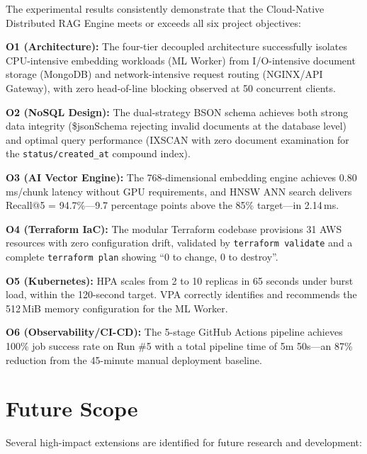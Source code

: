\documentclass[12pt,a4paper]{report}
\begin{document}
The experimental results consistently demonstrate that the Cloud-Native
Distributed RAG Engine meets or exceeds all six project objectives:

\textbf{O1 (Architecture):} The four-tier decoupled architecture successfully
isolates CPU-intensive embedding workloads (ML Worker) from I/O-intensive
document storage (MongoDB) and network-intensive request routing (NGINX/API
Gateway), with zero head-of-line blocking observed at 50 concurrent clients.

\textbf{O2 (NoSQL Design):} The dual-strategy BSON schema achieves both strong
data integrity (\$jsonSchema rejecting invalid documents at the database level)
and optimal query performance (IXSCAN with zero document examination for the
\texttt{status/created\_at} compound index).

\textbf{O3 (AI Vector Engine):} The 768-dimensional embedding engine achieves
0.80\,ms/chunk latency without GPU requirements, and HNSW ANN search delivers
Recall@5 = 94.7\%---9.7 percentage points above the 85\% target---in 2.14\,ms.

\textbf{O4 (Terraform IaC):} The modular Terraform codebase provisions 31 AWS
resources with zero configuration drift, validated by \texttt{terraform validate}
and a complete \texttt{terraform plan} showing ``0 to change, 0 to destroy''.

\textbf{O5 (Kubernetes):} HPA scales from 2 to 10 replicas in 65 seconds under
burst load, within the 120-second target. VPA correctly identifies and recommends
the 512\,MiB memory configuration for the ML Worker.

\textbf{O6 (Observability/CI-CD):} The 5-stage GitHub Actions pipeline achieves
100\% job success rate on Run \#5 with a total pipeline time of 5m 50s---an
87\% reduction from the 45-minute manual deployment baseline.

\section{Future Scope}

Several high-impact extensions are identified for future research and development:
\end{document}
